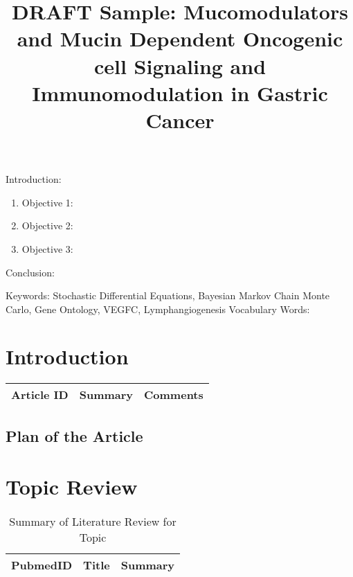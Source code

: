 

\twocolumn
\scriptsize
\begin{frontmatter}
		\title{DRAFT Sample: Mucomodulators and Mucin Dependent Oncogenic cell Signaling and Immunomodulation in Gastric Cancer}
		\author{}
		\address{The Mathematical Learning Space}
\end{frontmatter}	

Introduction:
\begin{enumerate}
\item Objective 1:
\item Objective 2:
\item Objective 3:
\end{enumerate}
Conclusion:

Keywords: Stochastic Differential Equations, Bayesian Markov Chain Monte Carlo, Gene Ontology, VEGFC, Lymphangiogenesis
Vocabulary Words:

\section{Introduction}

\begin{table}[H]\centering
	\begin{tabular}{p{1cm}p{4cm}p{3cm}}
		Article ID & Summary & Comments\\
		\hline
		\hline
	\end{tabular}
\end{table}

\subsection{Plan of the Article}

\begin{enumerate}
\end{enumerate}

\section{Topic Review}

\begin{table}[H]
\centering
\begin{tabular}{r|p{12cm}|l}
\hline
PubmedID  & Title & Summary \\
\hline	
\hline
	\end{tabular}
	\caption{Summary of Literature Review for Topic}
\end{table}	


